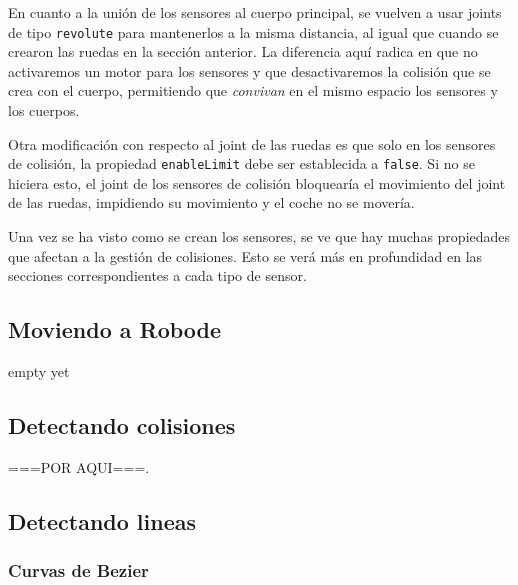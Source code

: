 En cuanto a la unión de los sensores al cuerpo principal, se vuelven a usar joints de tipo \texttt{revolute} para mantenerlos a la misma distancia, al igual que cuando se crearon las ruedas en la sección anterior. La diferencia aquí radica en que no activaremos un motor para los sensores y que desactivaremos la colisión que se crea con el cuerpo, permitiendo que \emph{convivan} en el mismo espacio los sensores y los cuerpos.

Otra modificación con respecto al joint de las ruedas es que solo en los sensores de colisión, la propiedad \texttt{enableLimit} debe ser establecida a \texttt{false}. Si no se hiciera esto, el joint de los sensores de colisión bloquearía el movimiento del joint de las ruedas, impidiendo su movimiento y el coche no se movería.

Una vez se ha visto como se crean los sensores, se ve que hay muchas propiedades que afectan a la gestión de colisiones. Esto se verá más en profundidad en las secciones correspondientes a cada tipo de sensor.

\subsection{Moviendo a Robode}
\label{moviendo-robode}


{\color{green}
empty yet
}


\subsection{Detectando colisiones}
\label{detectando-colisiones}



{\color{green} ===POR AQUI===}.



\subsection{Detectando lineas}
\label{detectando-lineas}

\subsubsection{Curvas de Bezier}
\label{bezier}



